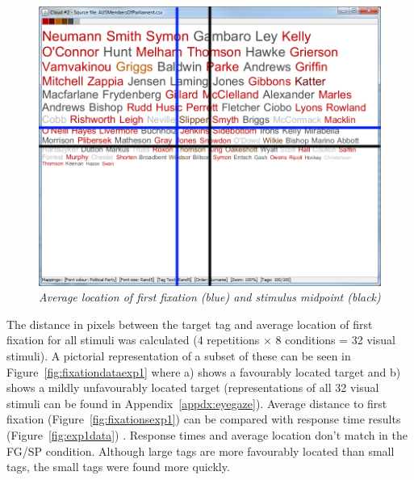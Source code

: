 \begin{figure}[!htb]
	\centering
	\includegraphics[scale=0.40]{average-firstfixation.png}
	\caption{\textit{Average location of first fixation (blue) and stimulus midpoint (black)}}
	\label{fig:exp1firstfix}
\end{figure}

The distance in pixels between the target tag and average location of first fixation for all stimuli was calculated (4 repetitions $\times$ 8 conditions = 32 visual stimuli). A pictorial representation of a subset of these can be seen in Figure~\vref{fig:fixationdataexp1} where a) shows a favourably located target and b) shows a mildly unfavourably located target (representations of all 32 visual stimuli can be found in Appendix~\ref{appdx:eyegaze}). Average distance to first fixation (Figure~\vref{fig:fixationsexp1}) can be compared with response time results (Figure~\vref{fig:exp1data}) . Response times and average location don't match in the FG/SP condition. Although large tags are more favourably located than small tags, the small tags were found more quickly.

